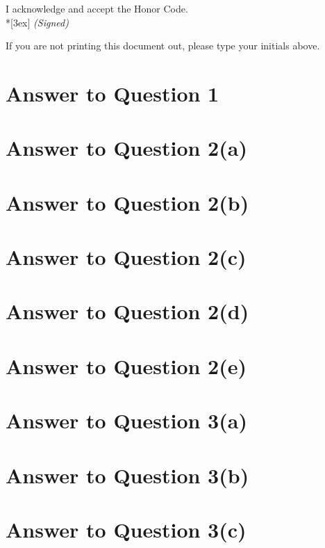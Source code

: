 \documentclass[11pt]{article}
\begin{document}
\vfill

I acknowledge and accept the Honor Code.\\*[3ex]
\bigskip
\textit{(Signed)}\hrulefill

If you are not printing this document out, please type your initials above.

\vfill
\vfill

\pagebreak[4]
\section*{Answer to Question 1}

\pagebreak[4]
\section*{Answer to Question 2(a)}

\pagebreak[4]
\section*{Answer to Question 2(b)}

\pagebreak[4]
\section*{Answer to Question 2(c)}

\pagebreak[4]
\section*{Answer to Question 2(d)}

\pagebreak[4]
\section*{Answer to Question 2(e)}

\pagebreak[4]
\section*{Answer to Question 3(a)}

\pagebreak[4]
\section*{Answer to Question 3(b)}

\pagebreak[4]
\section*{Answer to Question 3(c)}
\end{document}
